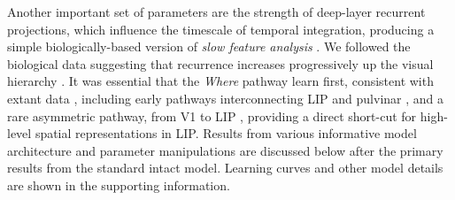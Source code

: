 \documentclass[11pt,twoside]{article}
\newif\myifpdf
\begin{document}
Another important set of parameters are the strength of deep-layer recurrent projections, which influence the timescale of temporal integration, producing a simple biologically-based version of \emph{slow feature analysis} \citep{WiskottSejnowski02,Foldiak91}. We followed the biological data suggesting that recurrence increases progressively up the visual hierarchy \citep{ChaudhuriKnoblauchGarielEtAl15}.  It was essential that the \emph{Where} pathway learn first, consistent with extant data \citep{BourneRosa06,KiorpesPriceHall-HaroEtAl12}, including early pathways interconnecting LIP and pulvinar \citep{BridgeLeopoldBourne16}, and a rare asymmetric pathway, from V1 to LIP \citep{MarkovErcsey-RavaszGomesEtAl14}, providing a direct short-cut for high-level spatial representations in LIP.  Results from various informative model architecture and parameter manipulations are discussed below after the primary results from the standard intact model.  Learning curves and other model details are shown in the supporting information.
\end{document}
